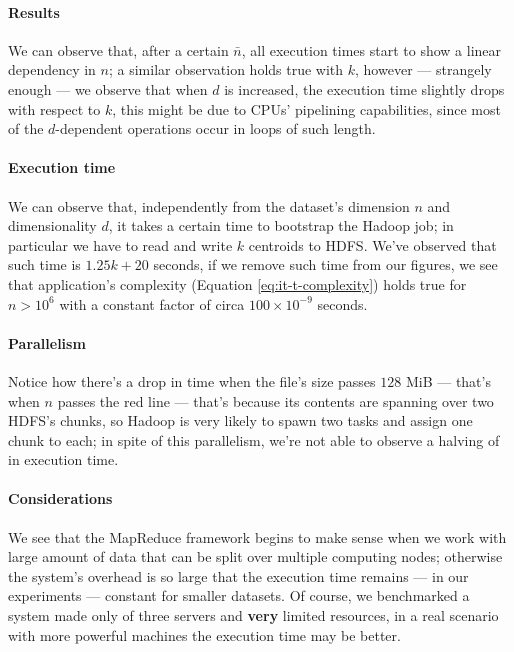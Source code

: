 \documentclass[parskip=full]{report}
\begin{document}
\paragraph{Results}
We can observe that, after a certain $\bar{n}$, all execution times start to show a linear dependency in $n$; a similar observation holds true with $k$, however --- strangely enough --- we observe that when $d$ is increased, the execution time slightly drops with respect to $k$, this might be due to CPUs' pipelining capabilities, since most of the $d$-dependent operations occur in loops of such length.

\paragraph{Execution time}
We can observe that, independently from the dataset's dimension $n$ and dimensionality $d$, it takes a certain time to bootstrap the Hadoop job; in particular we have to read and write $k$ centroids to HDFS. We've observed that such time is $1.25k + 20$ seconds, if we remove such time from our figures, we see that application's complexity (Equation \ref{eq:it-t-complexity}) holds true for $n > 10^6$ with a constant factor of circa $100 \times 10^{-9}$ seconds.

\paragraph{Parallelism}
Notice how there's a drop in time when the file's size passes $128$ MiB --- that's when $n$ passes the red line --- that's because its contents are spanning over two HDFS's chunks, so Hadoop is very likely to spawn two tasks and assign one chunk to each; in spite of this parallelism, we're not able to observe a halving of in execution time.

\paragraph{Considerations}
We see that the MapReduce framework begins to make sense when we work with large amount of data that can be split over multiple computing nodes; otherwise the system's overhead is so large that the execution time remains --- in our experiments --- constant for smaller datasets. Of course, we benchmarked a system made only of three servers and \textbf{very} limited resources, in a real scenario with more powerful machines the execution time may be better.
\end{document}
